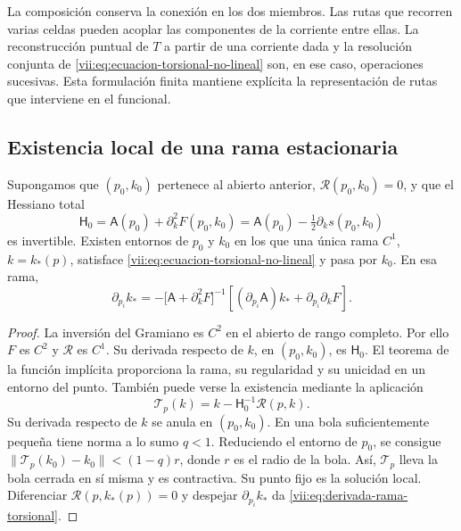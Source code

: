 La composición conserva la conexión en los dos miembros. Las rutas
que recorren varias celdas pueden acoplar las componentes de la
corriente entre ellas. La reconstrucción puntual de \(T\) a partir
de una corriente dada y la resolución conjunta de
\eqref{vii:eq:ecuacion-torsional-no-lineal} son, en ese caso,
operaciones sucesivas. Esta formulación finita mantiene explícita
la representación de rutas que interviene en el funcional.

\subsection{Existencia local de una rama estacionaria}
\label{vii:subsec:rama-torsional-local}

\begin{theorem}
\label{vii:thm:rama-torsional-local}
Supongamos que \((p_0,k_0)\) pertenece al abierto anterior,
\(\mathcal R(p_0,k_0)=0\), y que el Hessiano total
\begin{equation}
 \mathsf H_0
 =\mathsf A(p_0)+\partial_k^2F(p_0,k_0)
 =\mathsf A(p_0)-\tfrac12\partial_ks(p_0,k_0)
 \label{vii:eq:hessiano-total-torsional}
\end{equation}
es invertible. Existen entornos de \(p_0\) y \(k_0\) en los que
una única rama \(C^1\), \(k=k_*(p)\), satisface
\eqref{vii:eq:ecuacion-torsional-no-lineal} y pasa por \(k_0\).
En esa rama,
\begin{equation}
 \partial_{p_i}k_*
 =-\bigl[\mathsf A+\partial_k^2F\bigr]^{-1}
     \left[(\partial_{p_i}\mathsf A)k_*
                      +\partial_{p_i}\partial_kF\right].
 \label{vii:eq:derivada-rama-torsional}
\end{equation}
\end{theorem}

\begin{proof}
La inversión del Gramiano es \(C^2\) en el abierto de rango
completo. Por ello \(F\) es \(C^2\) y \(\mathcal R\) es
\(C^1\). Su derivada respecto de \(k\), en \((p_0,k_0)\), es
\(\mathsf H_0\). El teorema de la función implícita proporciona
la rama, su regularidad y su unicidad en un entorno del punto.
También puede verse la existencia mediante la aplicación
\[
 \mathcal T_p(k)=k-\mathsf H_0^{-1}\mathcal R(p,k).
\]
Su derivada respecto de \(k\) se anula en \((p_0,k_0)\).
En una bola suficientemente pequeña tiene norma a lo sumo
\(q<1\). Reduciendo el entorno de \(p_0\), se consigue
\(\|\mathcal T_p(k_0)-k_0\|<(1-q)r\), donde \(r\) es el
radio de la bola. Así, \(\mathcal T_p\) lleva la bola cerrada
en sí misma y es contractiva. Su punto fijo es la solución local.
Diferenciar \(\mathcal R(p,k_*(p))=0\) y despejar
\(\partial_{p_i}k_*\) da
\eqref{vii:eq:derivada-rama-torsional}.
\end{proof}

